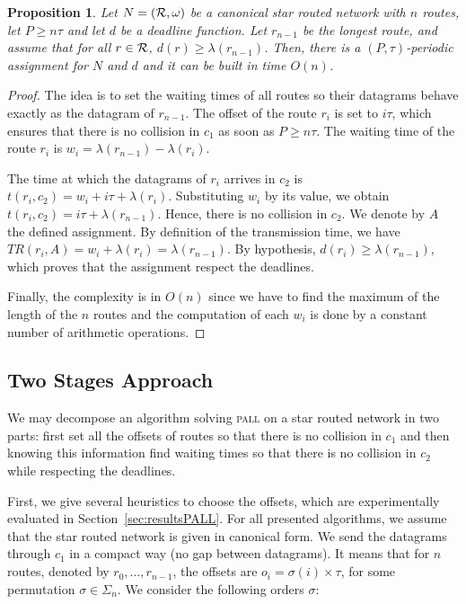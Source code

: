 \documentclass[a4paper,10pt]{journal}
\newtheorem{proposition}{Proposition}
\newcommand\pall{\textsc{pall}\xspace}
\begin{document}
	 \begin{proposition}\label{prop:asym}
	Let $N = ({\cal R}, \omega)$ be a canonical star routed network with $n$ routes, let $P \geq n\tau$ and let $d$ be a deadline function. Let $r_{n-1}$ be the longest route, and assume that for all $r\in {\cal R}$, $d(r) \geq \lambda(r_{n-1})$. Then, there is a $(P,\tau)$-periodic assignment for $N$ and $d$ and it can be built in time $O(n)$.
	 \end{proposition}
      \begin{proof}
       The idea is to set the waiting times of all routes so their datagrams behave exactly as the datagram of $r_{n-1}$. The offset of the route $r_i$ is set to $i\tau$, which ensures that there is no collision in $c_1$ as soon as $P \geq n\tau$. The waiting time of the route $r_i$ is $w_i = \lambda(r_{n-1}) - \lambda(r_{i})$.
        
    The time at which the datagrams of $r_i$ arrives in $c_2$ is $t(r_i, c_2) = w_i + i\tau + \lambda(r_{i})$. Substituting $w_i$ by its value, we obtain $t(r_i, c_2) =  i\tau + \lambda(r_{n-1})$.
    Hence, there is no collision in $c_2$. We denote by $A$ the defined assignment. By definition of the transmission time, we have $TR(r_i,A) = w_i + \lambda(r_i) = \lambda(r_{n-1})$. By hypothesis, $d(r_i) \geq \lambda(r_{n-1})$, which proves that the assignment respect the deadlines.

	Finally, the complexity is in $O(n)$ since we have to find the maximum of the length of the $n$ routes and the computation of each $w_i$ is done by a constant number of arithmetic operations.
     \end{proof}
     
    
     \subsection{Two Stages Approach}
     
      We may decompose an algorithm solving \pall on a star routed network in two parts: first set all the offsets of routes so that there is no collision in $c_1$ and then knowing this information find waiting times so that there is no collision in $c_2$ while respecting the deadlines. 
      
     First, we give several heuristics to choose the offsets, which are experimentally evaluated in Section~\ref{sec:resultsPALL}. For all presented algorithms, we assume that the star routed network is given in canonical form. 
      We send the datagrams through $c_1$ in a compact way (no gap between datagrams). It means that for $n$ routes, denoted by $r_0, \dots, r_{n-1}$, the offsets are $o_i = \sigma(i) \times \tau$, for some permutation $\sigma \in \Sigma_n$. We consider the following orders $\sigma$: 
	
\end{document}
